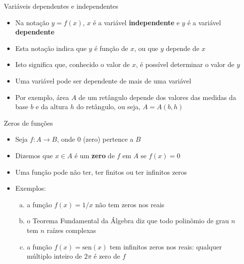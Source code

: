 \begin{frame}[fragile]{Variáveis dependentes e independentes}

    \begin{itemize}
        \item Na notação $y = f(x)$, $x$ é a variável \textbf{independente} e $y$ é a variável \textbf{dependente}

        \item Esta notação indica que $y$ é função de $x$, ou que $y$ depende de $x$

        \item Isto significa que, conhecido o valor de $x$, é possível determinar o valor de $y$

        \item Uma variável pode ser dependente de mais de uma variável

        \item Por exemplo, área $A$ de um retângulo depende dos valores das medidas da base $b$ e da altura $h$ do retângulo, ou seja, $A = A(b, h)$
    \end{itemize}

\end{frame}

\begin{frame}[fragile]{Zeros de funções}

    \begin{itemize}
        \item Seja $f: A \to B$, onde $0$ (zero) pertence a $B$

        \item Dizemos que $x\in A$ é um \textbf{zero} de $f$ em $A$ se $f(x) = 0$

        \item Uma função pode não ter, ter finitos ou ter infinitos zeros

        \item Exemplos:
        \begin{enumerate}[(a)]
            \item a função $f(x) = 1/x$ não tem zeros nos reais
            \item o Teorema Fundamental da Álgebra diz que todo polinômio de grau $n$ tem $n$ raízes complexas
            \item a função $f(x) = \mathrm{sen}(x)$ tem infinitos zeros nos reais: qualquer múltiplo inteiro de $2\pi$ é zero de $f$
        \end{enumerate}
    \end{itemize}

\end{frame}

